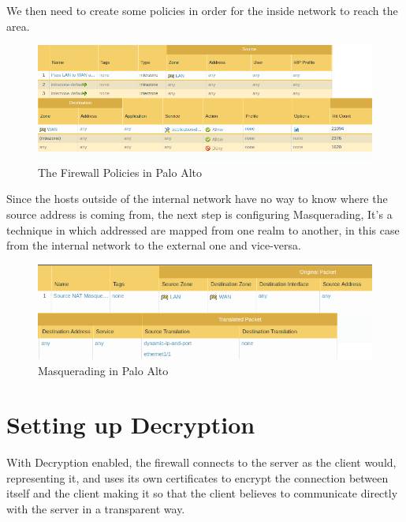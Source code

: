 \newpage

We then need to create some policies in order for the inside network to reach the  area.

\begin{figure}[!hb]
 \centering
 \includegraphics[width=13cm]{img/Firewall_Policy.png}
 \caption{The Firewall Policies in Palo Alto }
 \label{Firewall Policies}
\end{figure}


Since the hosts outside of the internal network have no way to know where the source address is coming from, the next step is configuring  Masquerading, It's a technique in which  addressed are mapped from one realm to another, in this case from the internal network to the external one and vice-versa\cite{rfc2663}.

\begin{figure}[!hb]
 \centering
 \includegraphics[width=13cm]{img/NAT_Masquerade.png}
 \caption{ Masquerading in Palo Alto }
 \label{NAT Masquerade}
\end{figure}


\newpage

\section{Setting up Decryption}

With Decryption enabled, the firewall connects to the server as the client would, representing it, and uses its own certificates to encrypt the connection between itself and the client making it so that the client believes to communicate directly with the server in a transparent way.

